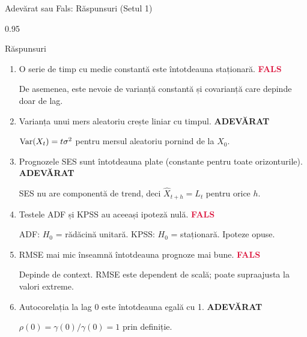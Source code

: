 \documentclass[9pt, aspectratio=169, t]{beamer}
\begin{document}
\begin{frame}{Adevărat sau Fals: Răspunsuri (Setul 1)}
    \begin{cminipage}{0.95\textwidth}
    \begin{exampleblock}{Răspunsuri}
    \begin{enumerate}\setlength{\itemsep}{0pt}
        \item O serie de timp cu medie constantă este întotdeauna staționară. \hfill \textbf{\textcolor{Crimson}{FALS}}

        {\small \textcolor{MediumGray}{De asemenea, este nevoie de varianță constantă și covarianță care depinde doar de lag.}}

        \vspace{0.15cm}

        \item Varianța unui mers aleatoriu crește liniar cu timpul. \hfill \textbf{\textcolor{Forest}{ADEVĂRAT}}

        {\small \textcolor{MediumGray}{$\text{Var}(X_t) = t\sigma^2$ pentru mersul aleatoriu pornind de la $X_0$.}}

        \vspace{0.15cm}

        \item Prognozele SES sunt întotdeauna plate (constante pentru toate orizonturile). \hfill \textbf{\textcolor{Forest}{ADEVĂRAT}}

        {\small \textcolor{MediumGray}{SES nu are componentă de trend, deci $\hat{X}_{t+h} = L_t$ pentru orice $h$.}}

        \vspace{0.15cm}

        \item Testele ADF și KPSS au aceeași ipoteză nulă. \hfill \textbf{\textcolor{Crimson}{FALS}}

        {\small \textcolor{MediumGray}{ADF: $H_0$ = rădăcină unitară. KPSS: $H_0$ = staționară. Ipoteze opuse.}}

        \vspace{0.15cm}

        \item RMSE mai mic înseamnă întotdeauna prognoze mai bune. \hfill \textbf{\textcolor{Crimson}{FALS}}

        {\small \textcolor{MediumGray}{Depinde de context. RMSE este dependent de scală; poate supraajusta la valori extreme.}}

        \vspace{0.15cm}

        \item Autocorelația la lag 0 este întotdeauna egală cu 1. \hfill \textbf{\textcolor{Forest}{ADEVĂRAT}}

        {\small \textcolor{MediumGray}{$\rho(0) = \gamma(0)/\gamma(0) = 1$ prin definiție.}}
    \end{enumerate}
    \end{exampleblock}
    \end{cminipage}
\end{frame}
\end{document}
